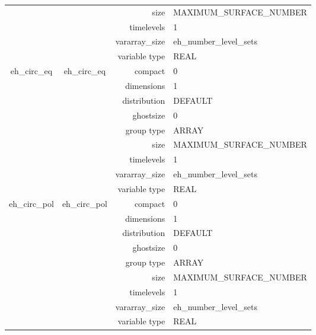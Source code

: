 \begin{tabular*}{150mm}{|c|c@{\extracolsep{\fill}}|rl|}
 &  & size & MAXIMUM\_SURFACE\_NUMBER \\ 
 &  & timelevels & 1 \\ 
 &  & vararray\_size & eh\_number\_level\_sets \\ 
 &  & variable type & REAL \\ 
\hline 
eh\_circ\_eq & eh\_circ\_eq & compact & 0 \\ 
 &  & dimensions & 1 \\ 
 &  & distribution & DEFAULT \\ 
 &  & ghostsize & 0 \\ 
 &  & group type & ARRAY \\ 
 &  & size & MAXIMUM\_SURFACE\_NUMBER \\ 
 &  & timelevels & 1 \\ 
 &  & vararray\_size & eh\_number\_level\_sets \\ 
 &  & variable type & REAL \\ 
\hline 
eh\_circ\_pol & eh\_circ\_pol & compact & 0 \\ 
 &  & dimensions & 1 \\ 
 &  & distribution & DEFAULT \\ 
 &  & ghostsize & 0 \\ 
 &  & group type & ARRAY \\ 
 &  & size & MAXIMUM\_SURFACE\_NUMBER \\ 
 &  & timelevels & 1 \\ 
 &  & vararray\_size & eh\_number\_level\_sets \\ 
 &  & variable type & REAL \\ 
\hline 
\end{tabular*} 



\vspace{5mm}
\vspace{5mm}

